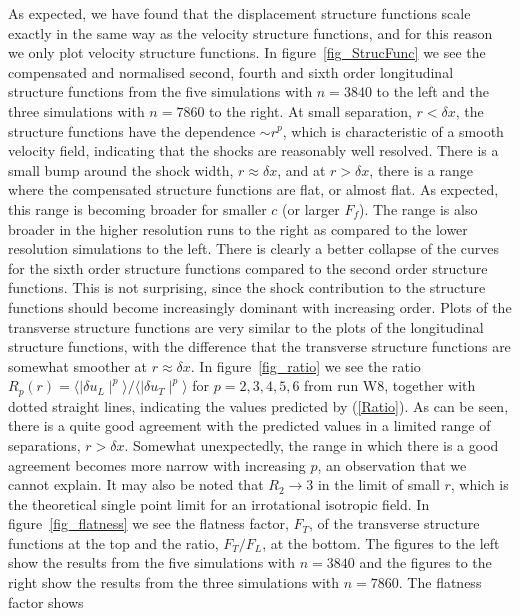 As expected, we have found that the displacement structure functions scale
exactly in the same way as the velocity structure functions, and for this reason we only plot
velocity structure functions. In figure~\ref{fig_StrucFunc} we see the
compensated and normalised second, fourth and sixth order longitudinal
structure functions from the five simulations with $ n = 3840 $ to the left and
the three simulations with $ n = 7860 $ to the right. At small separation, $ r
< \delta x $, the structure functions have the dependence $ \sim r^{p} $, which
is characteristic of a smooth velocity field, indicating that the shocks are
reasonably well resolved. There is a small bump around the shock width, $ r
\approx \delta x $, and at $ r > \delta x $, there is a range where the
compensated structure functions are flat, or almost flat. As expected, this
range is becoming broader for smaller $ c $ (or larger $ F_f $). The range is
also broader in the higher resolution runs to the right as compared to the
lower resolution simulations to the left. There is clearly a better collapse of
the curves for the sixth order structure functions compared to the second order
structure functions. This is not surprising, since the shock contribution to
the structure functions should become increasingly dominant with increasing
order. Plots of the transverse structure functions are very similar to the
plots of the longitudinal structure functions, with the difference that the
transverse structure functions are somewhat smoother at $ r \approx \delta x $.
In figure~\ref{fig_ratio} we see the ratio $ R_{p}(r) = \langle \mid \delta
u_L \mid ^{p} \rangle / \langle \mid \delta u_T \mid ^{p} \rangle$ for $ p=
2,3,4,5,6 $ from run W8, together with dotted straight lines, indicating the
values predicted by (\ref{Ratio}). As can be seen, there is a quite good
agreement with the predicted values in a limited range of separations, $ r >
\delta x $. Somewhat unexpectedly, the range in which there is a good agreement
becomes more narrow with increasing $ p $, an observation that we cannot
explain. It may also be noted that $ R_2 \rightarrow 3 $ in the limit of small
$ r $, which is the theoretical single point limit for an irrotational
isotropic field. In figure~\ref{fig_flatness} we see the flatness factor, $
F_T $, of the transverse structure functions at the top and the ratio, $
F_T/F_L $, at the bottom. The figures to the left show the results from the
five simulations with $ n = 3840 $ and the figures to the right show the
results from the three simulations with $ n = 7860 $. The flatness factor shows
